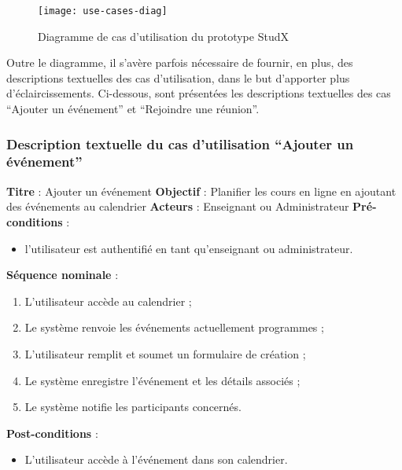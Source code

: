 \begin{figure}[H]
  \centering
  \texttt{[image: use-cases-diag]}
  \caption{Diagramme de cas d'utilisation du prototype StudX}
  \label{fig:use_case_diag}
\end{figure}


Outre le diagramme, il s'avère parfois nécessaire de fournir, en plus, des descriptions textuelles des cas 
d’utilisation, dans le but d’apporter plus d'éclaircissements. 
Ci-dessous, sont présentées les descriptions textuelles des cas “Ajouter un événement” et “Rejoindre une réunion”.

\subsubsection{Description textuelle du cas d’utilisation “Ajouter un événement”}
\textbf{Titre} : Ajouter un événement\newline
\textbf{Objectif} : Planifier les cours en ligne en ajoutant des événements au calendrier\newline
\textbf{Acteurs} : Enseignant ou Administrateur\newline
\textbf{Pré-conditions} : 
\begin{itemize}[noitemsep,topsep=0pt]
  \item l’utilisateur est authentifié en tant qu’enseignant ou administrateur.
\end{itemize}
\textbf{Séquence nominale} :
\begin{enumerate}[noitemsep,topsep=0pt]
  \item L’utilisateur accède au calendrier ;
	\item Le système renvoie les événements actuellement programmes ;
	\item L’utilisateur remplit et soumet un formulaire de création ;
	\item Le système enregistre l'événement et les détails associés ;
	\item Le système notifie les participants concernés.
\end{enumerate}
\textbf{Post-conditions} : 
\begin{itemize}[noitemsep,topsep=0pt]
  \item L’utilisateur accède à l'événement dans son calendrier.
\end{itemize}

